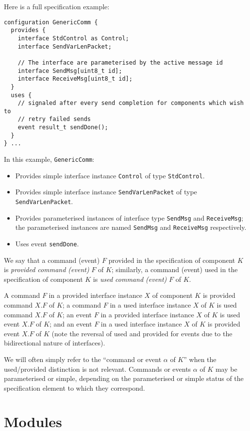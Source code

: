 \documentclass[11pt]{article}
\newcommand{\code}[1]{{\tt #1}}
\begin{document}
Here is a full specification example:
\begin{verbatim}
configuration GenericComm {
  provides {
    interface StdControl as Control;
    interface SendVarLenPacket;
    
    // The interface are parameterised by the active message id
    interface SendMsg[uint8_t id];
    interface ReceiveMsg[uint8_t id];
  }
  uses {
    // signaled after every send completion for components which wish to
    // retry failed sends
    event result_t sendDone();
  }
} ...
\end{verbatim}
In this example, \code{GenericComm}:
\begin{itemize}
\item Provides simple interface instance \code{Control} of type
\code{StdControl}.
\item Provides simple interface instance \code{SendVarLenPacket} of type
\code{SendVarLenPacket}.
\item Provides parameterised instances of interface type \code{SendMsg} and
\code{ReceiveMsg}; the parameterised instances are named \code{SendMsg} and
\code{ReceiveMsg} respectively.
\item Uses event \code{sendDone}.
\end{itemize}

We say that a command (event) $F$ provided in the specification of
component $K$ is \emph{provided command (event)} $F$ of $K$; similarly, a
command (event) used in the specification of component $K$ is \emph{used
command (event)} $F$ of $K$.

A command $F$ in a provided interface instance $X$ of component $K$ is
provided command $X.F$ of $K$; a command $F$ in a used interface instance
$X$ of $K$ is used command $X.F$ of $K$; an event $F$ in a provided
interface instance $X$ of $K$ is used event $X.F$ of $K$; and an event $F$
in a used interface instance $X$ of $K$ is provided event $X.F$ of $K$
(note the reversal of used and provided for events due to the bidirectional
nature of interfaces). 

We will often simply refer to the ``command or event $\alpha$ of $K$'' when
the used/provided distinction is not relevant.  Commands or events $\alpha$
of $K$ may be parameterised or simple, depending on the parameterised or
simple status of the specification element to which they correspond.

\section{Modules}
\label{sec:module}
\end{document}
